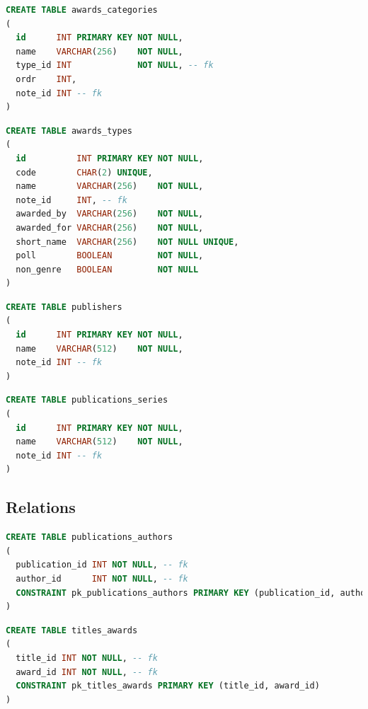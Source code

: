 \documentclass[doubleside, titlepage]{article}
\begin{document}
\begin{lstlisting}[language=SQL,showspaces=false,basicstyle=\ttfamily,numberstyle=\tiny,commentstyle=\color{gray}
        ]
CREATE TABLE awards_categories
(
  id      INT PRIMARY KEY NOT NULL,
  name    VARCHAR(256)    NOT NULL,
  type_id INT             NOT NULL, -- fk
  ordr    INT,
  note_id INT -- fk
)
\end{lstlisting}

\begin{lstlisting}[language=SQL,showspaces=false,basicstyle=\ttfamily,numberstyle=\tiny,commentstyle=\color{gray}
        ]
CREATE TABLE awards_types
(
  id          INT PRIMARY KEY NOT NULL,
  code        CHAR(2) UNIQUE,
  name        VARCHAR(256)    NOT NULL,
  note_id     INT, -- fk
  awarded_by  VARCHAR(256)    NOT NULL,
  awarded_for VARCHAR(256)    NOT NULL,
  short_name  VARCHAR(256)    NOT NULL UNIQUE,
  poll        BOOLEAN         NOT NULL,
  non_genre   BOOLEAN         NOT NULL 
)
\end{lstlisting}

\begin{lstlisting}[language=SQL,showspaces=false,basicstyle=\ttfamily,numberstyle=\tiny,commentstyle=\color{gray}
        ]
CREATE TABLE publishers
(
  id      INT PRIMARY KEY NOT NULL,
  name    VARCHAR(512)    NOT NULL,
  note_id INT -- fk
)
\end{lstlisting}

\begin{lstlisting}[language=SQL,showspaces=false,basicstyle=\ttfamily,numberstyle=\tiny,commentstyle=\color{gray}
        ]
CREATE TABLE publications_series
(
  id      INT PRIMARY KEY NOT NULL,
  name    VARCHAR(512)    NOT NULL,
  note_id INT -- fk
)
\end{lstlisting}

\subsection{Relations}

\begin{lstlisting}[language=SQL,showspaces=false,basicstyle=\ttfamily,numberstyle=\tiny,commentstyle=\color{gray}
        ]
CREATE TABLE publications_authors
(
  publication_id INT NOT NULL, -- fk
  author_id      INT NOT NULL, -- fk
  CONSTRAINT pk_publications_authors PRIMARY KEY (publication_id, author_id)
)
\end{lstlisting}

\begin{lstlisting}[language=SQL,showspaces=false,basicstyle=\ttfamily,numberstyle=\tiny,commentstyle=\color{gray}
        ]
CREATE TABLE titles_awards
(
  title_id INT NOT NULL, -- fk
  award_id INT NOT NULL, -- fk
  CONSTRAINT pk_titles_awards PRIMARY KEY (title_id, award_id)
)
\end{lstlisting}
\end{document}
